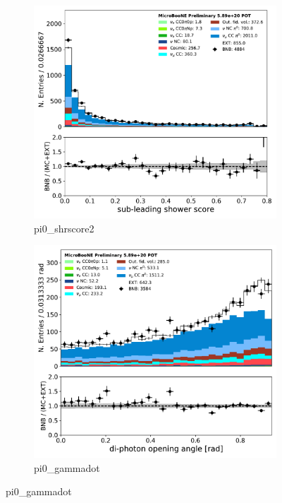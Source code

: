 \begin{figure}[H]
\begin{center}
\begin{subfigure}[b]{0.3\textwidth}
    \includegraphics[width=1.00\textwidth]{pi0/inputs/pi0_shrscore2_03182020_presel.pdf}
    \caption{\label{fig:pi0:inputs:shrscore2:RUN1} pi0\_shrscore2}
    \end{subfigure}
    \begin{subfigure}[b]{0.3\textwidth}
    \centering
    \includegraphics[width=1.00\textwidth]{pi0/inputs/pi0_gammadot_03182020_presel.pdf}
    \caption{\label{fig:pi0:inputs:gammadot:RUN1} pi0\_gammadot}
    \end{subfigure}
\end{center}
\end{figure}

